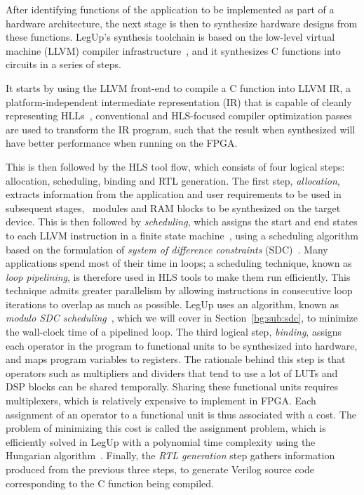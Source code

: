 After identifying functions of the application to be implemented as part
of a hardware architecture, the next stage is then to synthesize hardware
designs from these functions.  LegUp's synthesis toolchain is based on the
low-level virtual machine (LLVM) compiler infrastructure~\cite{llvm}, and it
synthesizes C functions into circuits in a series of steps.

It starts by using the LLVM front-end to compile a C function into LLVM IR,
a platform-independent intermediate representation (IR) that is capable of
cleanly representing HLLs~\cite{llvm_ir}, conventional and HLS-focused compiler
optimization passes are used to transform the IR program, such that the result
when synthesized will have better performance when running on the FPGA\@.

This is then followed by the HLS tool flow, which consists of four logical
steps: allocation, scheduling, binding and RTL generation.  The first step,
\emph{allocation}, extracts information from the application and user
requirements to be used in subsequent stages, \eg~modules and RAM blocks to be
synthesized on the target device.  This is then followed by \emph{scheduling},
which assigns the start and end states to each LLVM instruction in a finite
state machine~\cite{legup}, using a scheduling algorithm based on the
formulation of \emph{system of difference constraints} (SDC)~\cite{legup,
canis13, cong06}.  Many applications spend most of their time in loops; a
scheduling technique, known as \emph{loop pipelining}, is therefore used
in HLS tools to make them run efficiently.  This technique admits greater
parallelism by allowing instructions in consecutive loop iterations to overlap
as much as possible.  LegUp uses an algorithm, known as \emph{modulo SDC
scheduling}~\cite{canis14}, which we will cover in Section~\ref{bg:sub:sdc},
to minimize the wall-clock time of a pipelined loop.  The third logical step,
\emph{binding}, assigns each operator in the program to functional units to
be synthesized into hardware, and maps program variables to registers.  The
rationale behind this step is that operators such as multipliers and dividers
that tend to use a lot of LUTs and DSP blocks can be shared temporally.
Sharing these functional units requires multiplexers, which is relatively
expensive to implement in FPGA\@.  Each assignment of an operator to a
functional unit is thus associated with a cost.  The problem of minimizing this
cost is called the assignment problem, which is efficiently solved in LegUp
with a polynomial time complexity using the Hungarian algorithm~\cite{canis13,
kuhn10}.  Finally, the \emph{RTL generation} step gathers information produced
from the previous three steps, to generate Verilog source code corresponding to
the C function being compiled.

